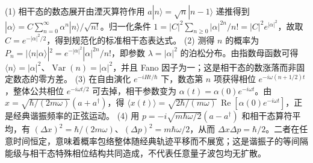 (1) 相干态的数态展开由湮灭算符作用 \(a|n\rangle=\sqrt n|n-1\rangle\) 递推得到 \(|\alpha\rangle=C\sum_{n=0}^\infty\alpha^n|n\rangle/\sqrt{n!}\)。归一化条件 \(1=|C|^2\sum_{n\ge0}|\alpha|^{2n}/n!=|C|^2e^{|\alpha|^2}\)，故取 \(C=e^{-|\alpha|^2/2}\)，得到规范化的标准相干态表达式。
(2) 测得 \(n\) 的概率为 \(P_n=|\langle n|\alpha\rangle|^2=e^{-|\alpha|^2}|\alpha|^{2n}/n!\)，即参数 \(\lambda=|\alpha|^2\) 的泊松分布。由指数母函数可得 \(\langle n\rangle=|\alpha|^2\)、\(\operatorname{Var}(n)=|\alpha|^2\)，并且 Fano 因子为一；这是相干态的数涨落而非固定数态的零方差。
(3) 在自由演化 \(e^{-iHt/\hbar}\) 下，数态第 \(n\) 项获得相位 \(e^{-i\omega(n+1/2)t}\)，整体公共相位 \(e^{-i\omega t/2}\) 可去掉，相干参数变为 \(\alpha(t)=\alpha(0)e^{-i\omega t}\)。由 \(x=\sqrt{\hbar/(2m\omega)}(a+a^\dagger)\)，得 \(\langle x(t)\rangle=\sqrt{2\hbar/(m\omega)}\,\operatorname{Re}[\alpha(0)e^{-i\omega t}]\)，正是经典谐振频率的正弦运动。
(4) 用 \(p=-i\sqrt{m\hbar\omega/2}(a-a^\dagger)\) 和相干态算符平均，有 \((\Delta x)^2=\hbar/(2m\omega)\)、\((\Delta p)^2=m\hbar\omega/2\)，从而 \(\Delta x\Delta p=\hbar/2\)。二者在任意时间恒定，意味着概率包络整体随经典轨迹平移而不展宽；这是谐振子的等间隔能级与相干态特殊相位结构共同造成，不代表任意量子波包均无扩散。
